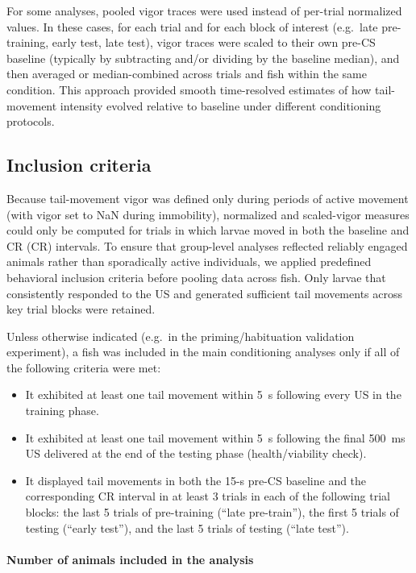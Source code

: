 For some analyses, pooled vigor traces were used instead of per-trial normalized values. In these cases, for each trial and for each block of interest (e.g.\ late pre-training, early test, late test), vigor traces were scaled to their own pre-CS baseline (typically by subtracting and/or dividing by the baseline median), and then averaged or median-combined across trials and fish within the same condition. This approach provided smooth time-resolved estimates of how tail-movement intensity evolved relative to baseline under different conditioning protocols.

\subsection{Inclusion criteria}

Because tail-movement vigor was defined only during periods of active movement (with vigor set to NaN during immobility), normalized and scaled-vigor measures could only be computed for trials in which larvae moved in both the baseline and CR (CR) intervals. To ensure that group-level analyses reflected reliably engaged animals rather than sporadically active individuals, we applied predefined behavioral inclusion criteria before pooling data across fish. Only larvae that consistently responded to the US and generated sufficient tail movements across key trial blocks were retained.

Unless otherwise indicated (e.g.\ in the priming/habituation validation experiment), a fish was included in the main conditioning analyses only if all of the following criteria were met:
\begin{itemize}
	\item It exhibited at least one tail movement within \SI{5}{\second} following every US in the training phase.
	\item It exhibited at least one tail movement within \SI{5}{\second} following the final \SI{500}{\milli\second} US delivered at the end of the testing phase (health/viability check).
	\item It displayed tail movements in both the 15-s pre-CS baseline and the corresponding CR interval in at least 3 trials in each of the following trial blocks: the last 5 trials of pre-training (``late pre-train''), the first 5 trials of testing (``early test''), and the last 5 trials of testing (``late test'').
\end{itemize}

\paragraph{Number of animals included in the analysis}

